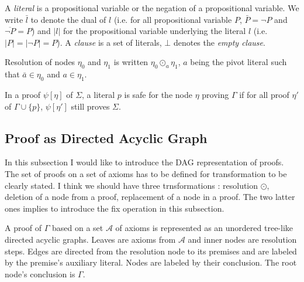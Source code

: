 \documentclass{llncs}
\newcommand{\dual}[1]{{\ensuremath{\bar{#1}}}}
\newenvironment{jogo}{\color{teal}}{}
\begin{document}
A \emph{literal} is a propositional variable or the negation of a propositional variable. We write
\dual{l} to denote the dual of $l$ (i.e. for all propositional variable $P$, $\dual{P} =
\neg P$ and $\overline{\neg P} = P$) and $|l|$ for the propositional variable underlying the literal
$l$ (i.e. $|P| = |\neg P| = P$). A \emph{clause} is a set of literals, $\bot$ denotes the
\emph{empty clause}.

\begin{notation}[Resolution]
Resolution of nodes $\eta_0$ and $\eta_1$ is written $\eta_0 \odot_a \eta_1$, $a$ being the pivot
literal such that $\bar{a} \in \eta_0$ and $a \in \eta_1$.
\end{notation}

\begin{definition}
In a proof $\psi[\eta]$ of $\Sigma$, a literal $p$ is safe for the node $\eta$ proving $\Gamma$ if
for all proof $\eta'$ of $\Gamma \cup \{p\}$, $\psi[\eta']$ still proves $\Sigma$.
\end{definition}

\subsection{Proof as Directed Acyclic Graph}

\begin{jogo}
In this subsection I would like to introduce the DAG representation of proofs.  The set of proofs on
a set of axioms has to be defined for transformation to be clearly stated. I think we should have
three trnsformations : resolution $\odot$, deletion of a node from a proof, replacement of a node in
a proof. The two latter ones implies to introduce the fix operation in this subsection.
\end{jogo}

A proof of $\Gamma$ based on a set $\mathcal{A}$ of axioms is represented as an unordered tree-like
directed acyclic graphs. Leaves are axioms from $\mathcal{A}$ and inner nodes are resolution steps.
Edges are directed from the resolution node to its premises and are labeled by the premise's
auxiliary literal. Nodes are labeled by their conclusion. The root node's conclusion is $\Gamma$.
\end{document}
